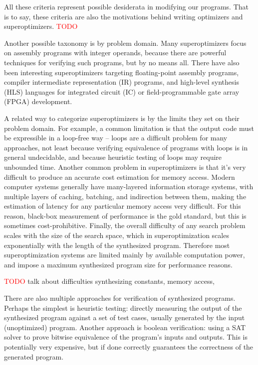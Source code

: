 \documentclass[12pt,twoside]{reedthesis}
\newcommand{\red}[1]{\textcolor{red}{#1}}
\begin{document}
All these criteria represent possible desiderata in modifying our programs.
That is to say, these criteria are also the motivations behind writing optimizers and superoptimizers. 
\red{TODO} %

Another possible taxonomy is by problem domain.
Many superoptimizers focus on assembly programs with integer operands, because there are powerful techniques for verifying such programs, but by no means all.
There have also been interesting superoptimizers targeting 
    floating-point assembly programs, 
    compiler intermediate representation (IR) programs, 
    and high-level synthesis (HLS) languages for integrated circuit (IC) or field-programmable gate array (FPGA) development.

A related way to categorize superoptimizers is by the limits they set on their problem domain.
For example, a common limitation is that the output code must be expressible in a loop-free way
    -- loops are a difficult problem for many approaches,
        not least because verifying equivalence of programs with loops is in general undecidable,
        and because heuristic testing of loops may require unbounded time.
Another common problem in superoptimizers is that it's very difficult to produce an accurate cost estimation for memory access.
    Modern computer systems generally have many-layered information storage systems, with multiple layers of caching, batching, and indirection between them, making the estimation of latency for any particular memory access very difficult.
    For this reason, black-box measurement of performance is the gold standard, but this is sometimes cost-prohibitive.
Finally, the overall difficulty of any search problem scales with the size of the search space, which in superoptimization scales exponentially with the length of the synthesized program.
    Therefore most superoptimization systems are limited mainly by available computation power, and impose a maximum synthesized program size for performance reasons.

\red{TODO} talk about difficulties synthesizing constants, memory access, %

There are also multiple approaches for verification of synthesized programs.
Perhaps the simplest is heuristic testing: 
    directly measuring the output of the synthesized program against a set of test cases, usually generated by the input (unoptimized) program.
Another approach is boolean verification: using a SAT solver to prove bitwise equivalence of the program's inputs and outputs.
This is potentially very expensive, but if done correctly guarantees the correctness of the generated program. 
\end{document}
